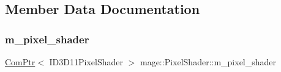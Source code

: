 \subsection{Member Data Documentation}
\hypertarget{classmage_1_1_pixel_shader_a1dd0f87be1c1f7fe5a1bb2737263222f}{}\label{classmage_1_1_pixel_shader_a1dd0f87be1c1f7fe5a1bb2737263222f} 
\subsubsection{\texorpdfstring{m\+\_\+pixel\+\_\+shader}{m\_pixel\_shader}}
{\footnotesize\ttfamily \hyperlink{namespacemage_ae74f374780900893caa5555d1031fd79}{Com\+Ptr}$<$ I\+D3\+D11\+Pixel\+Shader $>$ mage\+::\+Pixel\+Shader\+::m\+\_\+pixel\+\_\+shader\hspace{0.3cm}{\ttfamily [protected]}}

